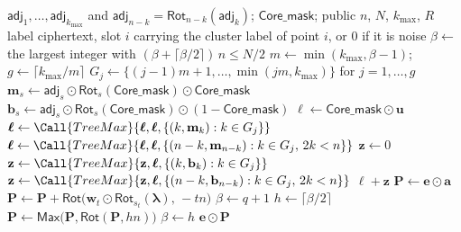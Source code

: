 \begin{algorithm}[tp]
\caption{\textsf{Label\_Propagation}}
\label{alg:lp}
\begin{algorithmic}[1]
\Require $\mathsf{adj}_1, \dots, \mathsf{adj}_{k_{\max}}$ and
  $\mathsf{adj}_{n-k} = \mathsf{Rot}_{n-k}(\mathsf{adj}_k)$;
  $\mathsf{Core\_mask}$; public $n$, $N$, $k_{\max}$, $R$
\Ensure label ciphertext, slot $i$ carrying the cluster label of point
  $i$, or $0$ if it is noise
\State $\beta \gets$ the largest integer with
  $(\beta + \lceil \beta/2 \rceil)\, n \le N/2$
\State $m \gets \min(k_{\max}, \beta-1)$;\quad
  $g \gets \lceil k_{\max}/m \rceil$
\State $G_j \gets \{(j-1)m + 1, \dots, \min(jm, k_{\max})\}$ for
  $j = 1, \dots, g$
  \State $\mathbf{m}_s \gets \mathsf{adj}_s \odot
    \mathsf{Rot}_s(\mathsf{Core\_mask}) \odot \mathsf{Core\_mask}$
  \State $\mathbf{b}_s \gets \mathsf{adj}_s \odot
    \mathsf{Rot}_s(\mathsf{Core\_mask}) \odot (1 - \mathsf{Core\_mask})$
\EndFor
\State $\boldsymbol{\ell} \gets \mathsf{Core\_mask} \odot \mathbf{u}$
   
    \State $\boldsymbol{\ell} \gets \Call{TreeMax}{\boldsymbol{\ell},
      \boldsymbol{\ell}, \{ (k, \mathbf{m}_k) : k \in G_j \}}$
  \EndFor
   
    \State $\boldsymbol{\ell} \gets \Call{TreeMax}{\boldsymbol{\ell},
      \boldsymbol{\ell}, \{ (n-k, \mathbf{m}_{n-k}) : k \in G_j,\,
      2k < n \}}$
  \EndFor
\EndFor
\State $\mathbf{z} \gets 0$
  \State $\mathbf{z} \gets \Call{TreeMax}{\mathbf{z}, \boldsymbol{\ell},
    \{ (k, \mathbf{b}_k) : k \in G_j \}}$
\EndFor
{}
  \State $\mathbf{z} \gets \Call{TreeMax}{\mathbf{z}, \boldsymbol{\ell},
    \{ (n-k, \mathbf{b}_{n-k}) : k \in G_j,\, 2k < n \}}$
\EndFor
\State \Return $\boldsymbol{\ell} + \mathbf{z}$
\Statex
{}
  \State $\mathbf{P} \gets \mathbf{e} \odot \mathbf{a}$
   
    \State $\mathbf{P} \gets \mathbf{P} + \mathsf{Rot}\bigl(
      \mathbf{w}_t \odot \mathsf{Rot}_{s_t}(\boldsymbol{\lambda}),\,
      -tn \bigr)$
  \EndFor
  \State $\beta \gets q + 1$
   
    \State $h \gets \lceil \beta/2 \rceil$
    \State $\mathbf{P} \gets \mathsf{Max}\bigl( \mathbf{P},
      \mathsf{Rot}(\mathbf{P}, hn) \bigr)$
    \State $\beta \gets h$
  \EndWhile
  \State \Return $\mathbf{e} \odot \mathbf{P}$
\EndFunction
\end{algorithmic}
\end{algorithm}